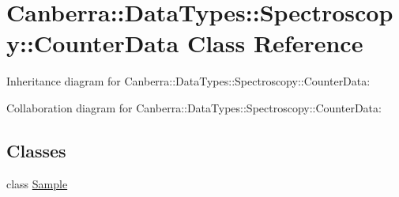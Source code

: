 \hypertarget{class_canberra_1_1_data_types_1_1_spectroscopy_1_1_counter_data}{}\section{Canberra\+:\+:Data\+Types\+:\+:Spectroscopy\+:\+:Counter\+Data Class Reference}
\label{class_canberra_1_1_data_types_1_1_spectroscopy_1_1_counter_data}


Inheritance diagram for Canberra\+:\+:Data\+Types\+:\+:Spectroscopy\+:\+:Counter\+Data\+:


Collaboration diagram for Canberra\+:\+:Data\+Types\+:\+:Spectroscopy\+:\+:Counter\+Data\+:
\subsection*{Classes}
\begin{DoxyCompactItemize}
\item 
class \hyperlink{class_canberra_1_1_data_types_1_1_spectroscopy_1_1_counter_data_1_1_sample}{Sample}
\end{DoxyCompactItemize}
